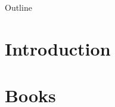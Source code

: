 \documentclass[
    NAME={Dr. Helga Ingimundardóttir},
    EMAIL={helgaingim@hi.is},
    FACULTY={Industrial Engineering},
    TITLE={Pushing Boundaries: A Data-Driven Dive into `Legend of the Ice People'},
    SUBTITLE={Unravel the unexpected synergy of literature and data science},
    SEMINAR={Haustráðstefna Advania},
    DATE={September 8, 2023}
    ]{hi-latex/hi-beamer}
\let\olditem\item
\renewcommand{\item}{\pause\olditem}
\begin{document}
\begin{frame}{Outline}
  \tableofcontents
\end{frame}

\section{Introduction}


\section{Books}


\begin{comment}
\begin{frame}{Introduction}
  \begin{itemize}
    \item Background on Margit Sandemo's series
    \item Importance of data-driven analysis in literature
    \item Objective of the study
  \end{itemize}
\end{frame}

\section{Methodology}
\begin{frame}{Methodology}
  \begin{itemize}
    \item Data Collection: print, audio, podcasts
    \item Tools and Techniques used
    \item Challenges and Solutions
  \end{itemize}
\end{frame}

\section{Insights}
\subsection{Character Analysis}
\begin{frame}{Character Analysis}
  \begin{itemize}
    \item Character relationships
    \item Dominant themes
  \end{itemize}
\end{frame}


\end{comment}
\end{document}
